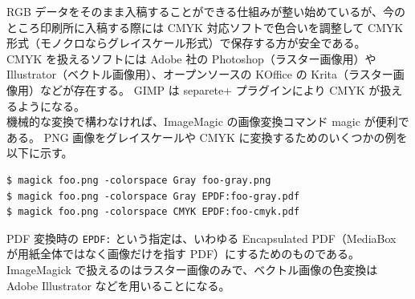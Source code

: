 RGB データをそのまま入稿することができる仕組みが整い始めているが、今のところ印刷所に入稿する際には CMYK 対応ソフトで色合いを調整して CMYK 形式（モノクロならグレイスケール形式）で保存する方が安全である。\\

CMYK を扱えるソフトには Adobe 社の Photoshop（ラスター画像用）やIllustrator（ベクトル画像用）、オープンソースの KOffice の Krita（ラスター画像用）などが存在する。
GIMP は separete+ プラグインにより CMYK が扱えるようになる。\\

機械的な変換で構わなければ、ImageMagic の画像変換コマンド magic が便利である。
PNG 画像をグレイスケールや CMYK に変換するためのいくつかの例を以下に示す。
\begin{mdframed}[roundcorner=0.50zw,leftmargin=3.00zw,rightmargin=3.00zw,skipabove=0.40zw,skipbelow=0.40zw,innertopmargin=4.00pt,innerbottommargin=4.00pt,innerleftmargin=5.00pt,innerrightmargin=5.00pt,linecolor=gray!090,linewidth=0.50pt,backgroundcolor=gray!90]\color{gray!10}
\begin{verbatim}
$ magick foo.png -colorspace Gray foo-gray.png
$ magick foo.png -colorspace Gray EPDF:foo-gray.pdf
$ magick foo.png -colorspace CMYK EPDF:foo-cmyk.pdf
\end{verbatim}
\end{mdframed}
PDF 変換時の \texttt{EPDF:} という指定は、いわゆる Encapsulated PDF（MediaBox が用紙全体ではなく画像だけを指す PDF）にするためのものである。
ImageMagick で扱えるのはラスター画像のみで、ベクトル画像の色変換は Adobe Illustrator などを用いることになる。
